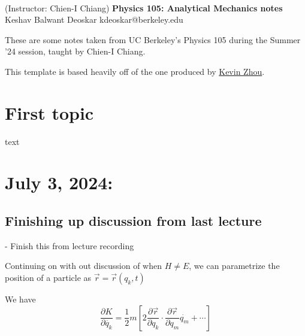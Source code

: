 \documentclass[11pt]{article}
\begin{document}
\thispagestyle{empty}
\bigskip \
\vspace{0.1cm}

\begin{center}
{\fontsize{22}{22} \selectfont (Instructor: Chien-I Chiang)}
\vskip 16pt
{\fontsize{36}{36} \selectfont \bf \sffamily Physics 105: Analytical Mechanics notes}
\vskip 24pt
{\fontsize{18}{18} \selectfont \rmfamily Keshav Balwant Deoskar} 
\vskip 6pt
{\fontsize{14}{14} \selectfont \ttfamily kdeoskar@berkeley.edu} 
\vskip 24pt
\end{center}



These are some notes taken from UC Berkeley's Physics 105 during the Summer '24 session, taught by Chien-I Chiang.

\vskip 0.5cm
This template is based heavily off of the one produced by \href{https://knzhou.github.io/}{Kevin Zhou}.

\tableofcontents 


\newpage
\section{First topic}

\vskip 0.5cm
text


\newpage
\section{July 3, 2024:}

\subsection{Finishing up discussion from last lecture}
- Finish this from lecture recording

\vskip 0.5cm
Continuing on with out discussion of when $H \neq E$, we can parametrize the position of a particle as $\vec{r} = \vec{r}(q_k, t)$

We have 
\[ \frac{\partial K}{\partial \dot{q_{k}}} = \frac{1}{2}m \left[ 2 \frac{\partial \vec{r}}{\partial q_k} \cdot \frac{\partial \vec{r}}{\partial q_{m}} \dot{q_{m}} + \cdots \right] \]
\end{document}
